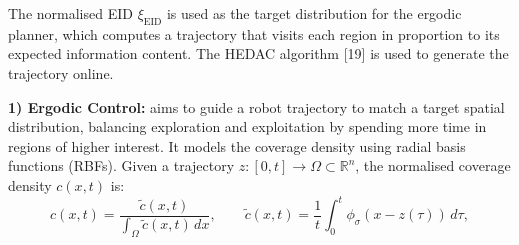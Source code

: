 \documentclass[11pt]{article}
\begin{document}
The normalised EID $\xi_{\mathrm{EID}}$ is used as the target
distribution for the ergodic planner, which computes a trajectory
that visits each region in proportion to its expected information
content. The HEDAC algorithm [19] is used to generate the trajectory
online.

\textbf{1) Ergodic Control:} aims to guide a robot trajectory to
match a target spatial distribution, balancing exploration and
exploitation by spending more time in regions of higher interest. It
models the coverage density using radial basis functions (RBFs).
Given a trajectory
$z: [0, t] \to \Omega \subset \mathbb{R}^{n}$,
the normalised coverage density $c(x, t)$ is:
\[
c(x, t) = \frac{\tilde{c}(x, t)}{\int_{\Omega} \tilde{c}(x, t)\,dx},
\qquad
\tilde{c}(x, t) = \frac{1}{t}\int_{0}^{t}
\phi_{\sigma}(x - z(\tau))\,d\tau,
\]
\end{document}
